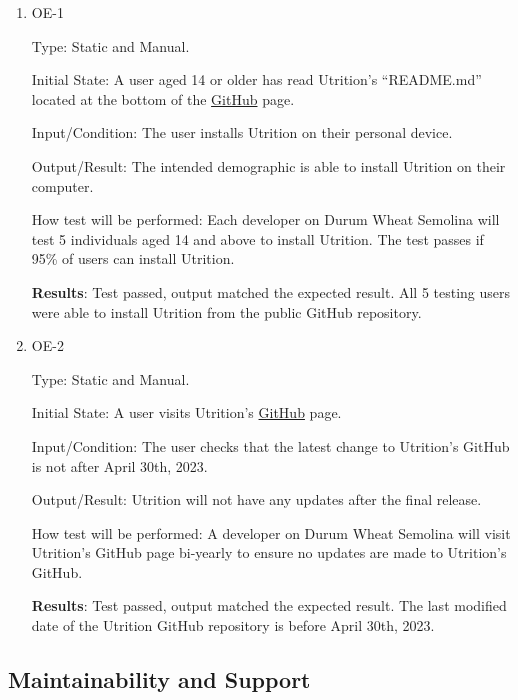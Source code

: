 \documentclass[12pt, titlepage]{article}
\begin{document}
	\begin{enumerate}
		
		\item{OE-1} 
		
		Type: Static and Manual.
		
		Initial State: A user aged 14 or older has read Utrition’s “README.md” located at the bottom of the \href{https://github.com/jeff-rey-wang/utrition/}{GitHub} page.
		
		Input/Condition: The user installs Utrition on their personal device.
		
		Output/Result: The intended demographic is able to install Utrition on their computer.
		
		How test will be performed: Each developer on Durum Wheat Semolina will test 5 individuals aged 14 and above to install Utrition. The test passes if 95\% of users can install Utrition.
		
		\textbf{Results}: Test passed, output matched the expected result. All 5 testing users were able to install Utrition from the public GitHub repository.
		
		\item{OE-2} 
		
		Type: Static and Manual.
		
		Initial State: A user visits Utrition’s \href{https://github.com/jeff-rey-wang/utrition/}{GitHub} page.
		
		Input/Condition: The user checks that the latest change to Utrition’s GitHub is not after April 30th, 2023.
		
		Output/Result: Utrition will not have any updates after the final release.
		
		How test will be performed: A developer on Durum Wheat Semolina will visit Utrition’s GitHub page bi-yearly to ensure no updates are made to Utrition’s GitHub.
		
		\textbf{Results}: Test passed, output matched the expected result. The last modified date of the Utrition GitHub repository is before April 30th, 2023.
		
	\end{enumerate}
	
	\subsection{Maintainability and Support}
	
\end{document}
